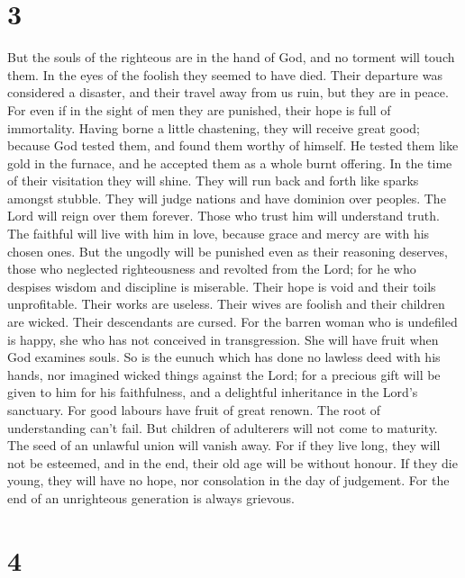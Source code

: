 \hypertarget{section-1}{%
\section{3}\label{section-1}}

 But the souls of the righteous are in the hand of God, and
no torment will touch them.  In the eyes of the foolish they
seemed to have died. Their departure was considered a disaster,
 and their travel away from us ruin, but they are in peace.
 For even if in the sight of men they are punished, their
hope is full of immortality.  Having borne a little
chastening, they will receive great good; because God tested them, and
found them worthy of himself.  He tested them like gold in
the furnace, and he accepted them as a whole burnt offering.
 In the time of their visitation they will shine. They will
run back and forth like sparks amongst stubble.  They will
judge nations and have dominion over peoples. The Lord will reign over
them forever.  Those who trust him will understand truth.
The faithful will live with him in love, because grace and mercy are
with his chosen ones.  But the ungodly will be punished
even as their reasoning deserves, those who neglected righteousness and
revolted from the Lord;  for he who despises wisdom and
discipline is miserable. Their hope is void and their toils
unprofitable. Their works are useless.  Their wives are
foolish and their children are wicked.  Their descendants
are cursed. For the barren woman who is undefiled is happy, she who has
not conceived in transgression. She will have fruit when God examines
souls.  So is the eunuch which has done no lawless deed
with his hands, nor imagined wicked things against the Lord; for a
precious gift will be given to him for his faithfulness, and a
delightful inheritance in the Lord's sanctuary.  For good
labours have fruit of great renown. The root of understanding can't
fail.  But children of adulterers will not come to
maturity. The seed of an unlawful union will vanish away. 
For if they live long, they will not be esteemed, and in the end, their
old age will be without honour.  If they die young, they
will have no hope, nor consolation in the day of judgement.
 For the end of an unrighteous generation is always
grievous.

\hypertarget{section-2}{%
\section{4}\label{section-2}}

